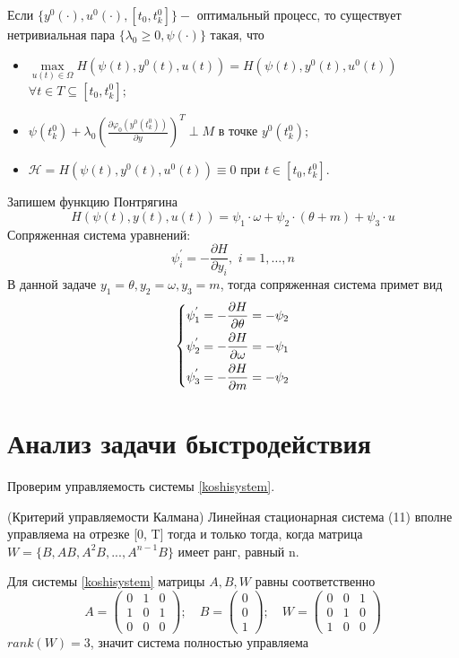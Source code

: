 \documentclass[a4paper,12pt, openany]{book}
\theoremstyle{plain} %
\theoremstyle{definition} %
\theoremstyle{remark} %
\numberwithin{equation}{chapter}
\begin{document}
{Если $\{y^0(\cdot),u^0(\cdot),[t_0,t_k^0]\} - $ оптимальный процесс, то существует нетривиальная пара $\{\lambda_0\geq0,\psi(\cdot)\}$
такая, что
\begin{itemize}
    \item $ \mathop {\max }\limits_{u(t) \in \Omega}  H(\psi(t),y^0(t),u(t))=H(\psi(t),y^0(t),u^0(t))$
          $\forall t \in T \subseteq [t_0,t_k^0];$
    \item $\psi(t_k^0)+\lambda_0(\frac{\partial \varphi_0(y^0(t_k^0))}{\partial y})^T \perp M \text{ в точке } y^0(t_k^0);$
    \item $\mathcal{H}=H(\psi(t),y^0(t),u^0(t))\equiv0 \text{ при } t \in [t_0,t_k^0].$
\end{itemize}
Запишем функцию Понтрягина
\[
    H(\psi(t),y(t),u(t))=\psi_1\cdot\omega+\psi_2\cdot(\theta+m)+\psi_3\cdot u
\]
Сопряженная система уравнений:
\[
    \psi^{'}_i  =  - \frac{{\partial H}}{{\partial y_i }},\,\,i = 1, \ldots ,n
\]
В данной задаче $y_1 = \theta, y_2 = \omega, y_3=m$, тогда сопряженная система примет вид
\begin{equation} \label{7}
    \left\{ {\begin{aligned}
                 & \psi^{'}_1=  - \frac{{\partial H}}{{\partial \theta}} = - \psi_2\hfill  \\
                 & \psi^{'}_2=  - \frac{{\partial H}}{{\partial \omega }} = - \psi_1\hfill \\
                 & \psi^{'}_3=  - \frac{{\partial H}}{{\partial m }} = - \psi_2 \hfill     \\
            \end{aligned}} \right.
\end{equation}

\section{Анализ задачи быстродействия}
Проверим управляемость системы \eqref{koshisystem}.

(Критерий управляемости Калмана) Линейная стационарная система (11) вполне управляема на отрезке [0, T] тогда и
только тогда, когда матрица $W = \{B, AB, A^2B, ..., A^{n-1}B\}$ имеет ранг, равный n.

Для системы \eqref{koshisystem} матрицы $A, B, W$ равны соответственно
$$ A =
    \begin{pmatrix}
        0 & 1 & 0 \\
        1 & 0 & 1 \\
        0 & 0 & 0
    \end{pmatrix};
    \quad
    B =
    \begin{pmatrix}
        0 \\
        0 \\
        1
    \end{pmatrix};
    \quad
    W =
    \begin{pmatrix}
        0 & 0 & 1 \\
        0 & 1 & 0 \\
        1 & 0 & 0
        \end{pmatrix}
$$
$rank (W)=3$, значит система полностью управляема

}
\end{document}
